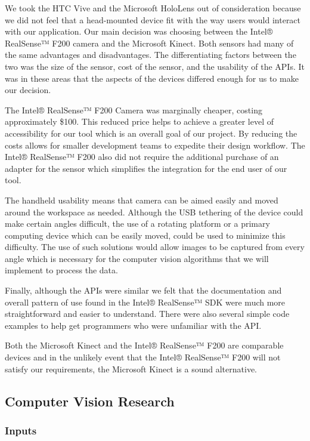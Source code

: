 \documentclass[12pt]{article}
\begin{document}
We took the HTC Vive and the Microsoft HoloLens out of consideration
because we did not feel that a head-mounted device fit with the way
users would interact with our application. Our main decision was
choosing between the Intel® RealSense™ F200 camera and the Microsoft
Kinect. Both sensors had many of the same advantages and disadvantages.
The differentiating factors between the two was the size of the sensor,
cost of the sensor, and the usability of the APIs. It was in these areas
that the aspects of the devices differed enough for us to make our
decision.

The Intel® RealSense™ F200 Camera was marginally cheaper, costing
approximately \$100. This reduced price helps to achieve a greater level
of accessibility for our tool which is an overall goal of our project.
By reducing the costs allows for smaller development teams to expedite
their design workflow. The Intel® RealSense™ F200 also did not require
the additional purchase of an adapter for the sensor which simplifies
the integration for the end user of our tool.

The handheld usability means that camera can be aimed easily and moved
around the workspace as needed. Although the USB tethering of the device
could make certain angles difficult, the use of a rotating platform or a
primary computing device which can be easily moved, could be used to
minimize this difficulty. The use of such solutions would allow images
to be captured from every angle which is necessary for the computer
vision algorithms that we will implement to process the data.

Finally, although the APIs were similar we felt that the documentation
and overall pattern of use found in the Intel® RealSense™ SDK were much
more straightforward and easier to understand. There were also several
simple code examples to help get programmers who were unfamiliar with
the API.

Both the Microsoft Kinect and the Intel® RealSense™ F200 are comparable
devices and in the unlikely event that the Intel® RealSense™ F200 will
not satisfy our requirements, the Microsoft Kinect is a sound
alternative.

\subsection{Computer Vision Research}\label{computer-vision-research}

\subsubsection{Inputs}\label{inputs}
\end{document}
